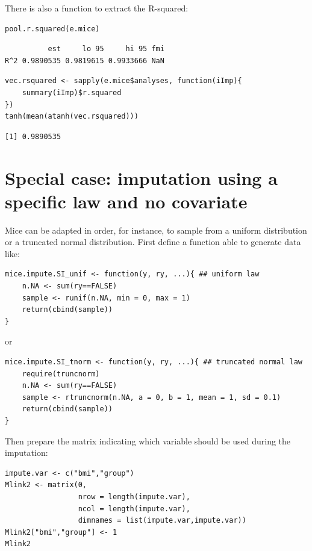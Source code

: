 \documentclass[12pt]{article}
\begin{document}
\bigskip

There is also a function to extract the R-squared:
\lstset{language=r,label= ,caption= ,captionpos=b,numbers=none}
\begin{lstlisting}
pool.r.squared(e.mice)
\end{lstlisting}

\begin{verbatim}
          est     lo 95     hi 95 fmi
R^2 0.9890535 0.9819615 0.9933666 NaN
\end{verbatim}

\lstset{language=r,label= ,caption= ,captionpos=b,numbers=none}
\begin{lstlisting}
vec.rsquared <- sapply(e.mice$analyses, function(iImp){
	summary(iImp)$r.squared
})
tanh(mean(atanh(vec.rsquared)))
\end{lstlisting}

\begin{verbatim}
[1] 0.9890535
\end{verbatim}

\clearpage

\section{Special case: imputation using a specific law and no covariate}
\label{sec:orge0d65eb}
Mice can be adapted in order, for instance, to sample from a uniform
distribution or a truncated normal distribution. First define a
function able to generate data like:
\lstset{language=r,label= ,caption= ,captionpos=b,numbers=none}
\begin{lstlisting}
mice.impute.SI_unif <- function(y, ry, ...){ ## uniform law
	n.NA <- sum(ry==FALSE)
	sample <- runif(n.NA, min = 0, max = 1)
	return(cbind(sample))
}
\end{lstlisting}

or

\lstset{language=r,label= ,caption= ,captionpos=b,numbers=none}
\begin{lstlisting}
mice.impute.SI_tnorm <- function(y, ry, ...){ ## truncated normal law
	require(truncnorm)
	n.NA <- sum(ry==FALSE)
	sample <- rtruncnorm(n.NA, a = 0, b = 1, mean = 1, sd = 0.1)
	return(cbind(sample))
}
\end{lstlisting}
Then prepare the matrix indicating which variable should be used
during the imputation:
\lstset{language=r,label= ,caption= ,captionpos=b,numbers=none}
\begin{lstlisting}
impute.var <- c("bmi","group")
Mlink2 <- matrix(0, 
				 nrow = length(impute.var), 
				 ncol = length(impute.var), 
				 dimnames = list(impute.var,impute.var))
Mlink2["bmi","group"] <- 1
Mlink2
\end{lstlisting}
\end{document}
